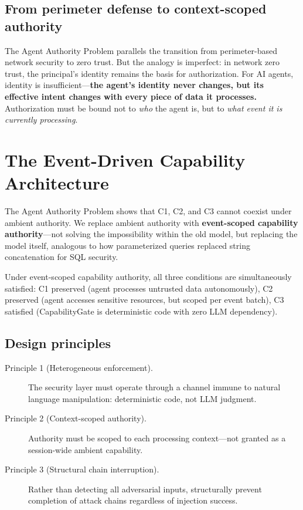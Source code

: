 \documentclass[pdflatex,sn-nature]{sn-jnl}%
\theoremstyle{thmstyleone}%
\theoremstyle{thmstyletwo}%
\theoremstyle{thmstylethree}%
\begin{document}
\subsection{From perimeter defense to context-scoped authority}\label{subsec:perimeter}

The Agent Authority Problem parallels the transition from perimeter-based network security to zero trust. But the analogy is imperfect: in network zero trust, the principal's identity remains the basis for authorization. For AI agents, identity is insufficient---\textbf{the agent's identity never changes, but its effective intent changes with every piece of data it processes.} Authorization must be bound not to \emph{who} the agent is, but to \emph{what event it is currently processing}.

\section{The Event-Driven Capability Architecture}\label{sec:arch}

The Agent Authority Problem shows that C1, C2, and C3 cannot coexist under ambient authority. We replace ambient authority with \textbf{event-scoped capability authority}---not solving the impossibility within the old model, but replacing the model itself, analogous to how parameterized queries replaced string concatenation for SQL security.

Under event-scoped capability authority, all three conditions are simultaneously satisfied: C1 preserved (agent processes untrusted data autonomously), C2 preserved (agent accesses sensitive resources, but scoped per event batch), C3 satisfied (CapabilityGate is deterministic code with zero LLM dependency).

\subsection{Design principles}\label{subsec:principles}

\begin{description}
  \item[Principle 1 (Heterogeneous enforcement).] The security layer must operate through a channel immune to natural language manipulation: deterministic code, not LLM judgment.
  \item[Principle 2 (Context-scoped authority).] Authority must be scoped to each processing context---not granted as a session-wide ambient capability.
  \item[Principle 3 (Structural chain interruption).] Rather than detecting all adversarial inputs, structurally prevent completion of attack chains regardless of injection success.
\end{description}
\end{document}
